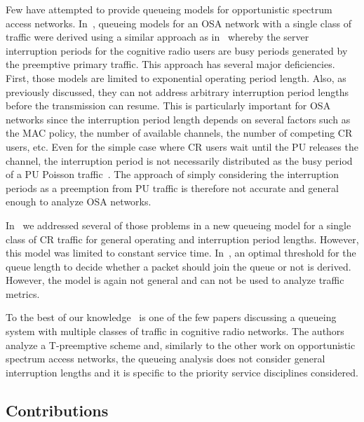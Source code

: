 \documentclass[11pt,journal,oneside,onecolumn,draftclsnofoot]{IEEEtran}
\begin{document}
Few have attempted to provide queueing models for opportunistic spectrum access networks. In~\cite{wang-l11,rashid07,laourine10}, queueing models for an OSA network with a single class of traffic were derived using a similar approach as in~\cite{federgruen86,avi-itzhak63,takagi91,gaver62,fiems08} whereby the server interruption periods for the cognitive radio users are busy periods generated by the preemptive primary traffic. This approach has several major deficiencies. First, those models are limited to exponential operating period length. Also, as  previously discussed, they can not address arbitrary interruption period lengths before the transmission can resume. This is particularly important for OSA networks since the interruption period length depends on several factors such as the MAC policy, the number of available channels, the number of competing CR users, etc. Even for the simple case where CR users wait until the PU releases the channel, the interruption period is not necessarily distributed as the busy period of a PU Poisson traffic~\cite{chen-D09}. The approach of simply considering the interruption periods as a preemption from PU traffic is therefore not accurate and general enough to analyze OSA networks.

In~\cite{azarfar12e} we  addressed several of those problems in a new queueing model for a single class of CR traffic for general operating and interruption period lengths. However, this model was limited to constant service time. In~\cite{li11}, an optimal threshold for the queue length to decide whether a packet should join the queue or not is derived. However, the model is again not general and can not be used to analyze traffic metrics.

To the best of our knowledge~\cite{kim12} is one of the few papers discussing a queueing system with multiple classes of traffic in cognitive radio networks. The authors analyze a T-preemptive scheme and, similarly to the other work on opportunistic spectrum access networks, the queueing analysis does not consider general interruption lengths and it is specific to the  priority service disciplines
considered.






   





\subsection{Contributions}
\end{document}
